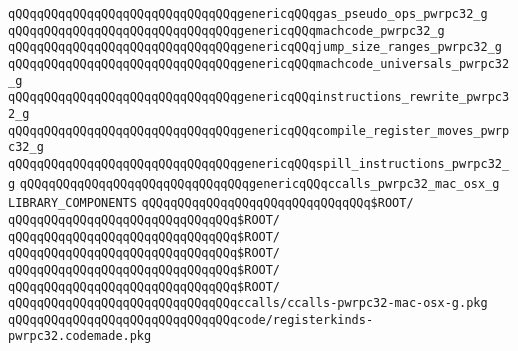 \verb|qQQqqQQqqQQqqQQqqQQqqQQqqQQqqQQqgenericqQQqgas_pseudo_ops_pwrpc32_g|\newline
\verb|qQQqqQQqqQQqqQQqqQQqqQQqqQQqqQQqgenericqQQqmachcode_pwrpc32_g|\newline
\verb|qQQqqQQqqQQqqQQqqQQqqQQqqQQqqQQqgenericqQQqjump_size_ranges_pwrpc32_g|\newline
\verb|qQQqqQQqqQQqqQQqqQQqqQQqqQQqqQQqgenericqQQqmachcode_universals_pwrpc32_g|\newline
\verb|qQQqqQQqqQQqqQQqqQQqqQQqqQQqqQQqgenericqQQqinstructions_rewrite_pwrpc32_g|\newline
\verb|qQQqqQQqqQQqqQQqqQQqqQQqqQQqqQQqgenericqQQqcompile_register_moves_pwrpc32_g|\newline
\verb|qQQqqQQqqQQqqQQqqQQqqQQqqQQqqQQqgenericqQQqspill_instructions_pwrpc32_g|\newline
\verb|qQQqqQQqqQQqqQQqqQQqqQQqqQQqqQQqgenericqQQqccalls_pwrpc32_mac_osx_g|\newline
\newline
\newline
\newline
\verb|LIBRARY_COMPONENTS|\newline
\newline
\verb|qQQqqQQqqQQqqQQqqQQqqQQqqQQqqQQq$ROOT/|\newline
\verb|qQQqqQQqqQQqqQQqqQQqqQQqqQQqqQQq$ROOT/|\newline
\verb|qQQqqQQqqQQqqQQqqQQqqQQqqQQqqQQq$ROOT/|\newline
\verb|qQQqqQQqqQQqqQQqqQQqqQQqqQQqqQQq$ROOT/|\newline
\verb|qQQqqQQqqQQqqQQqqQQqqQQqqQQqqQQq$ROOT/|\newline
\verb|qQQqqQQqqQQqqQQqqQQqqQQqqQQqqQQq$ROOT/|\newline
\newline
\verb|qQQqqQQqqQQqqQQqqQQqqQQqqQQqqQQqccalls/ccalls-pwrpc32-mac-osx-g.pkg|\newline
\verb|qQQqqQQqqQQqqQQqqQQqqQQqqQQqqQQqcode/registerkinds-pwrpc32.codemade.pkg|\newline
